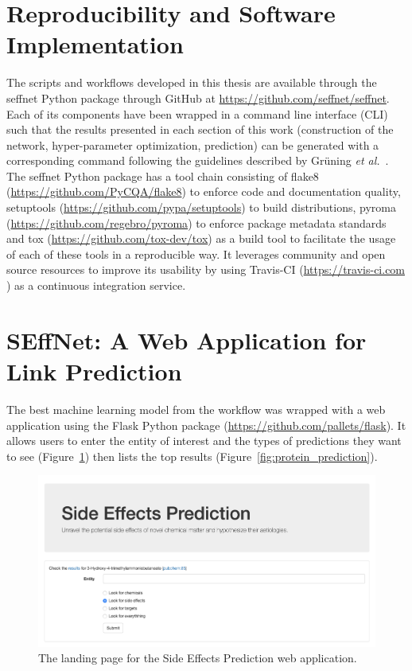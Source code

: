 \section{Reproducibility and Software Implementation}

The scripts and workflows developed in this thesis are available through the seffnet Python package through GitHub at \url{https://github.com/seffnet/seffnet}.
Each of its components have been wrapped in a command line interface (CLI) such that the results presented in each section of this work (construction of the network, hyper-parameter optimization, prediction) can be generated with a corresponding command following the guidelines described by Grüning \textit{et al.}~\cite{gruning_software_2019}.
The seffnet Python package has a tool chain consisting of flake8 (\url{https://github.com/PyCQA/flake8}) to enforce code and documentation quality, setuptools (\url{https://github.com/pypa/setuptools}) to build distributions, pyroma (\url{https://github.com/regebro/pyroma}) to enforce package metadata standards and tox (\url{https://github.com/tox-dev/tox}) as a build tool to facilitate the usage of each of these tools in a reproducible way.
It leverages community and open source resources to improve its usability by using Travis-CI (\url{https://travis-ci.com} ) as a continuous integration service.

\section{SEffNet: A Web Application for Link Prediction}

The best machine learning model from the workflow was wrapped with a web application using the Flask Python package (\url{https://github.com/pallets/flask}).
It allows users to enter the entity of interest and the types of predictions they want to see (Figure~\ref{fig:web_page}) then lists the top results (Figure~\ref{fig:protein_prediction}).

\begin{figure}[h!]
    \centering
    \includegraphics[scale=0.35]
    {figures/web_page.png}
    \caption{\label{fig:web_page} The landing page for the Side Effects Prediction web application.}
\end{figure}

